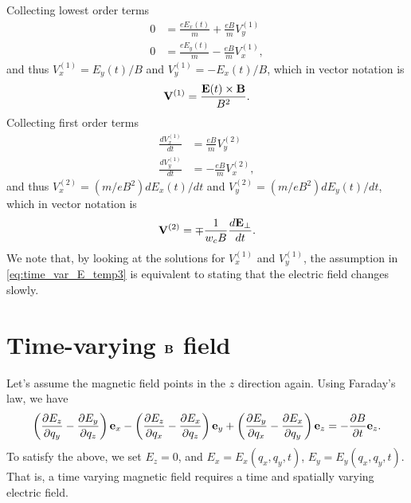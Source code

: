 \documentclass[oneside,a4paper,11pt]{report}
\begin{document}
Collecting lowest order terms
\begin{align}
    0 &= \frac{eE_x(t)}{m} + \frac{eB}{m} V_y^{(1)}  \nonumber \\
    0 &= \frac{eE_y(t)}{m} - \frac{eB}{m} V_x^{(1)} ,
\end{align}
and thus $V^{(1)}_x = E_y(t)/B$ and $V^{(1)}_y = -E_x(t)/B$, which in vector notation is
\begin{equation}
    \mathbf{V}^{(1)} = \frac{\mathbf{E}(t) \times \mathbf{B}}{B^2}.
\end{equation}
Collecting first order terms 
\begin{align}
    \frac{dV_x^{(1)}}{dt} &=  \frac{eB}{m} V_y^{(2)} \nonumber \\
    \frac{dV_y^{(1)}}{dt} &=  -\frac{eB}{m} V_x^{(2)},
\end{align}
and thus $V_x^{(2)} = (m/eB^2)dE_x(t)/dt$ and $V_y^{(2)} = (m/eB^2) dE_y(t)/dt$, which in vector notation is
\begin{equation}
    \mathbf{V}^{(2)} = \mp \frac{1}{w_c B}\frac{d\mathbf{E}_\perp}{dt}.
\end{equation}
We note that, by looking at the solutions for $V_x^{(1)}$ and $V_y^{(1)}$, the assumption in \cref{eq:time_var_E_temp3} is equivalent to stating that the electric field changes slowly. 

\section{Time-varying $\mathbf{B}$ field}
Let's assume the magnetic field points in the $z$ direction again. Using Faraday's law, we have
\begin{equation}
    \left(\frac{\partial E_z}{\partial q_y} - \frac{\partial E_y}{\partial q_z} \right) \mathbf{e}_x - \left(\frac{\partial E_z}{\partial q_x} - \frac{\partial E_x}{\partial q_z} \right) \mathbf{e}_y + \left(\frac{\partial E_y}{\partial q_x} - \frac{\partial E_x}{\partial q_y} \right) \mathbf{e}_z = -\frac{\partial B}{\partial t} \mathbf{e}_z.
\end{equation}
To satisfy the above, we set $E_z = 0$, and $E_x = E_x(q_x,q_y,t)$, $E_y = E_y(q_x,q_y,t)$. That is, a time varying magnetic field requires a time and spatially varying electric field. 
\end{document}
